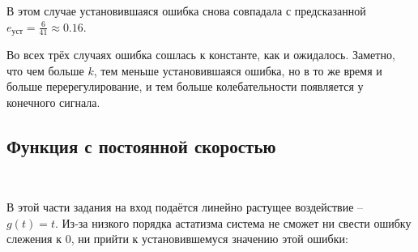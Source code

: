 \documentclass[a4paper]{article}
\begin{document}
В этом случае установившаяся ошибка снова совпадала с предсказанной $e_{\text{уст}} =\frac{6}{41} \approx 0.16$.

Во всех трёх случаях ошибка сошлась к константе, как и ожидалось. Заметно, что чем больше $k$, тем меньше установившаяся ошибка, но в то же время и больше перерегулирование, и тем больше колебательности появляется у конечного сигнала.

\subsection{Функция с постоянной скоростью}\

В этой части задания на вход подаётся линейно растущее воздействие -- $g(t) = t$. Из-за низкого порядка астатизма система не сможет ни свести ошибку слежения к 0, ни прийти к установившемуся значению этой ошибки: 
\end{document}
